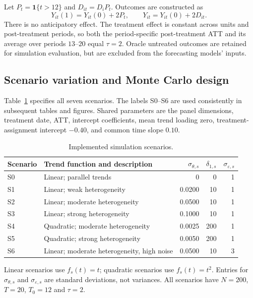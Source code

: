 \documentclass[11pt,a4paper]{article}
\begin{document}
Let $P_t=\mathbf{1}\{t>12\}$ and $D_{it}=D_iP_t$. Outcomes are constructed as
\begin{equation}\label{eq:observed}
Y_{it}(1)=Y_{it}(0)+2P_t,
\qquad Y_{it}=Y_{it}(0)+2D_{it}.
\end{equation}
There is no anticipatory effect. The treatment effect is constant across units and post-treatment periods, so both the period-specific post-treatment ATT and its average over periods $13$--$20$ equal $\tau=2$. Oracle untreated outcomes are retained for simulation evaluation, but are excluded from the forecasting models' inputs.

\subsection{Scenario variation and Monte Carlo design}
Table~\ref{tab:scenarios} specifies all seven scenarios. The labels S0--S6 are used consistently in subsequent tables and figures. Shared parameters are the panel dimensions, treatment date, ATT, intercept coefficients, mean trend loading zero, treatment-assignment intercept $-0.40$, and common time slope $0.10$.

\begin{table}[htbp]
\centering\small
\caption{Implemented simulation scenarios.}\label{tab:scenarios}
\begin{tabular}{llrrr}
\toprule
Scenario & Trend function and description & $\sigma_{\theta,s}$ & $\delta_{1,s}$ & $\sigma_{\varepsilon,s}$ \\
\midrule
S0 & Linear; parallel trends & 0 & 0 & 1 \\
S1 & Linear; weak heterogeneity & 0.0200 & 10 & 1 \\
S2 & Linear; moderate heterogeneity & 0.0500 & 10 & 1 \\
S3 & Linear; strong heterogeneity & 0.1000 & 10 & 1 \\
S4 & Quadratic; moderate heterogeneity & 0.0025 & 200 & 1 \\
S5 & Quadratic; strong heterogeneity & 0.0050 & 200 & 1 \\
S6 & Linear; moderate heterogeneity, high noise & 0.0500 & 10 & 3 \\
\bottomrule
\end{tabular}
\par\smallskip\begin{minipage}{0.95\linewidth}\footnotesize Linear scenarios use $f_s(t)=t$; quadratic scenarios use $f_s(t)=t^2$. Entries for $\sigma_{\theta,s}$ and $\sigma_{\varepsilon,s}$ are standard deviations, not variances. All scenarios have $N=200$, $T=20$, $T_0=12$ and $\tau=2$.\end{minipage}
\end{table}
\end{document}
